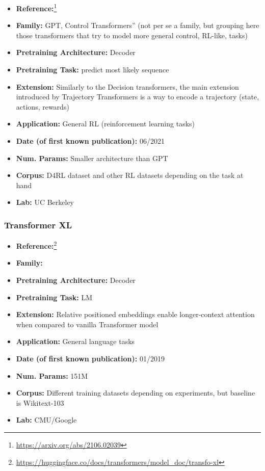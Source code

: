 \documentclass{article}
\begin{document}
            \begin{itemize}
                \item \textbf{Reference:}\footnote{\url{https://arxiv.org/abs/2106.02039}}\cite{janner2021offline}
                \item \textbf{Family:} GPT, Control Transformers” (not per se a family, but grouping here those transformers that try to model more general control, RL-like, tasks) 
                \item \textbf{Pretraining Architecture:} Decoder
                \item \textbf{Pretraining Task:} predict most likely sequence
                \item \textbf{Extension:} Similarly to the Decision transformers, the main extension introduced by Trajectory Transformers is a way to encode a trajectory (state, actions, rewards)  
                \item \textbf{Application:} General RL (reinforcement learning tasks)
                \item \textbf{Date (of first known publication):} 06/2021
                \item \textbf{Num. Params:} Smaller architecture than GPT
                \item \textbf{Corpus:} D4RL dataset and other RL datasets depending on the task at hand
                \item \textbf{Lab:} UC Berkeley
            \end{itemize}

\subsubsection{Transformer XL}

            \begin{itemize}
                \item \textbf{Reference:}\footnote{\url{https://huggingface.co/docs/transformers/model_doc/transfo-xl}}\cite{dai2019transformer}
                \item \textbf{Family:} 
                \item \textbf{Pretraining Architecture:} Decoder
                \item \textbf{Pretraining Task:} LM
                \item \textbf{Extension:} Relative positioned embeddings enable longer-context attention when compared to vanilla Transformer model  
                \item \textbf{Application:} General language tasks
                \item \textbf{Date (of first known publication):} 01/2019
                \item \textbf{Num. Params:} 151M
                \item \textbf{Corpus:} Different training datasets depending on experiments, but baseline is Wikitext-103
                \item \textbf{Lab:} CMU/Google
            \end{itemize}
\end{document}
